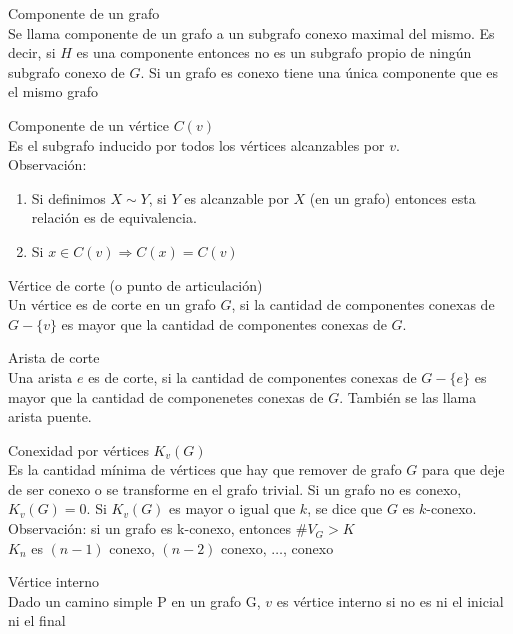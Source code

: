 \documentclass{article}
\begin{document}
\begin{defn}
Componente de un grafo\\ Se llama componente de un grafo a un subgrafo conexo maximal del mismo. Es decir, si $H$ es una componente entonces no es un subgrafo propio de ningún subgrafo conexo de $G$. Si un grafo es conexo tiene una única componente que es el mismo grafo
\end{defn}

\begin{defn}
Componente de un vértice $C(v)$ \\ Es el subgrafo inducido por todos los vértices alcanzables por $v$. \\
Observación:
\begin{enumerate}
    \item Si definimos $X \sim Y$, si $Y$ es alcanzable por $X$ (en un grafo) entonces esta relación es de equivalencia.
    \item Si $x \in C(v) \Rightarrow C(x)=C(v)$
\end{enumerate}
\end{defn}

\begin{defn}
Vértice de corte (o punto de articulación)\\ Un vértice es de corte en un grafo $G$, si la cantidad de componentes conexas de $G-\{v\}$ es mayor que la cantidad de componentes conexas de $G$.
\end{defn}

\begin{defn}
Arista de corte\\ Una arista $e$ es de corte, si la cantidad de componentes conexas de $G-\{e\}$ es mayor que la cantidad de componenetes conexas de $G$. También se las llama arista puente.
\end{defn}

\begin{defn}
Conexidad por vértices $K_{v}(G)$ \\ Es la cantidad mínima de vértices que hay que remover de grafo $G$ para que deje de ser conexo o se transforme en el grafo trivial. Si un grafo no es conexo, $K_{v}(G)=0 .$ Si $K_{v}(G)$ es mayor o igual que $k$,
se dice que $G$ es $k$-conexo. \\
Observación: si un grafo es k-conexo, entonces $\# V_{G}>K$ \\
$K_n$ es $(n-1)$ conexo, $(n-2)$ conexo, $\dots$, conexo
\end{defn}

\begin{defn}
Vértice interno\\ Dado un camino simple P en un grafo G, $v$ es vértice interno si no es ni el inicial ni el final
\end{defn}
\end{document}
